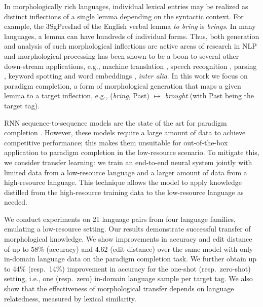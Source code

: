 \documentclass[11pt,letterpaper]{article}
\newcommand{\word}[1]{{\em #1}}
\newcommand{\mtag}[1]{{\small{\textsf{#1}}}}
\begin{document}
In morphologically rich languages, individual lexical entries may be
realized as distinct inflections of a single lemma depending on the
syntactic 
context. For example, the \mtag{3SgPresInd} of the English
verbal lemma \word{to bring} is \word{brings}. In many languages,
a lemma can have hundreds of individual forms. Thus, both
generation and analysis of such morphological
inflections are active areas of research in NLP and
morphological processing has been shown to be a boon to several other
down-stream applications, e.g., machine translation
\cite{dyer2008generalizing}, speech recognition
\cite{creutz2007analysis}, parsing \cite{TACL631}, keyword spotting
\cite{narasimhan2014morphological} and word embeddings
\cite{CotterellSE16}, {\em inter alia}. In this work we focus on paradigm
completion, a form of morphological generation that maps a given lemma
to a target inflection, e.g., 
(\word{bring}, \mtag{Past}) $\mapsto$
\word{brought} (with \mtag{Past} being the target tag).

RNN sequence-to-sequence models
\cite{sutskever2014sequence,bahdanau2014neural} are the state
of the art for paradigm completion
\cite{FaruquiTND16,kann-schutze:2016,cotterell-et-al-2016-shared}. However,
these models require a large amount of data to achieve
competitive performance; this makes them
unsuitable for out-of-the-box application to paradigm completion in
the low-resource scenario. To mitigate this, we consider transfer
learning: we train an end-to-end neural system jointly with
limited data from a low-resource language and a larger amount of data
from a high-resource language. This technique allows the model to
apply knowledge distilled from the high-resource training data to the
low-resource language as needed.

We conduct experiments on 21 language pairs from four
language families, emulating a low-resource setting. 
Our results demonstrate successful transfer of morphological
knowledge. We show improvements 
in accuracy and edit distance 
of up to 
58\% (accuracy)
and 4.62 (edit distance) over the same model with only in-domain
language data on the paradigm completion task. We further obtain up to 
44\% (resp.\ 14\%) improvement in accuracy for the one-shot
(resp.\ zero-shot) setting, i.e.,  one (resp.\ zero) in-domain language sample per target tag.
We also show that
the effectiveness
of morphological transfer depends on 
language relatedness,
measured by lexical similarity.
\end{document}
